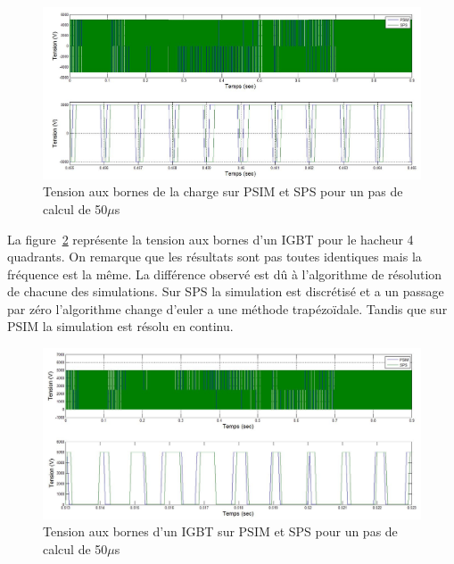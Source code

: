 \documentclass[11pt,letterpaper,final]{report}
\begin{document}
\begin{figure}[htb]
\centering
\includegraphics[scale=0.5]{Fig/Hacheur4Quadrants/HacheurTensionCharge50u.jpg}
\caption{Tension aux bornes de la charge sur PSIM et SPS pour un pas de calcul de 50$\mu$s}
\label{err_cou}
\end{figure}

La figure~\ref{hc_IG_ten_50} représente la tension aux bornes d'un IGBT pour le hacheur 4 quadrants. On remarque que les résultats sont pas toutes identiques mais la fréquence est la même. La différence observé est dû à l'algorithme de résolution de chacune des simulations. Sur SPS la simulation est discrétisé et a un passage par zéro l'algorithme change d'euler a une méthode trapézoïdale. Tandis que sur PSIM la simulation est résolu en continu.
\begin{figure}[htb]
\centering
\includegraphics[scale=0.5]{Fig/Hacheur4Quadrants/HacheurTensionIGBT50u.jpg}
\caption{Tension aux bornes d'un IGBT sur PSIM et SPS pour un pas de calcul de 50$\mu$s}
\label{hc_IG_ten_50}
\end{figure}

\clearpage
\end{document}
